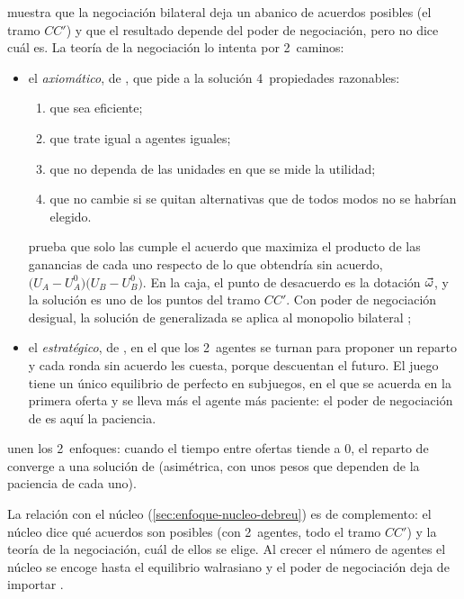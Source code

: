 \documentclass[11pt]{article}
\begin{document}
 muestra que la negociación bilateral deja un abanico de acuerdos posibles (el tramo $CC'$) y que el resultado depende del poder de negociación, pero no dice cuál es. La teoría de la negociación lo intenta por 2~caminos:
\begin{itemize}
\item el \emph{axiomático}, de \textcite{Nash1950Bargaining}, que pide a la solución 4~propiedades razonables:
  \begin{enumerate}
  \item que sea eficiente;
  \item que trate igual a agentes iguales;
  \item que no dependa de las unidades en que se mide la utilidad;
  \item que no cambie si se quitan alternativas que de todos modos no se habrían elegido.
  \end{enumerate}
   prueba que solo las cumple el acuerdo que maximiza el producto de las ganancias de cada uno respecto de lo que obtendría sin acuerdo, $\big(U_A-U_A^0\big)\big(U_B-U_B^0\big)$. En la caja, el punto de desacuerdo es la dotación $\vec{\omega}$, y la solución es uno de los puntos del tramo $CC'$. Con poder de negociación desigual, la solución de  generalizada se aplica al monopolio bilateral ;
\item el \emph{estratégico}, de \textcite{Rubinstein1982Perfect}, en el que los 2~agentes se turnan para proponer un reparto y cada ronda sin acuerdo les cuesta, porque descuentan el futuro. El juego tiene un único equilibrio de  perfecto en subjuegos, en el que se acuerda en la primera oferta y se lleva más el agente más paciente: el poder de negociación de  es aquí la paciencia.
\end{itemize}
\textcite{BinmoreRubinsteinWolinsky1986Nash} unen los 2~enfoques: cuando el tiempo entre ofertas tiende a 0, el reparto de  converge a una solución de  (asimétrica, con unos pesos que dependen de la paciencia de cada uno).

La relación con el núcleo (\ref{sec:enfoque-nucleo-debreu}) es de complemento: el núcleo dice qué acuerdos son posibles (con 2~agentes, todo el tramo $CC'$) y la teoría de la negociación, cuál de ellos se elige. Al crecer el número de agentes el núcleo se encoge hasta el equilibrio walrasiano y el poder de negociación deja de importar  .
\end{document}
